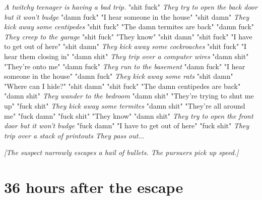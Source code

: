\documentclass{report}
\begin{document}
\textit{A twitchy teenager is having a bad trip.} "shit fuck" \textit{They try to open the back door but it won't budge} "damn fuck" "I hear someone in the house" "shit damn" \textit{They kick away some centipedes} "shit fuck" "The damn termites are back" "damn fuck" \textit{They creep to the garage} "shit fuck" "They know" "shit damn" \textit{} "shit fuck" "I have to get out of here" "shit damn" \textit{They kick away some cockroaches} "shit fuck" "I hear them closing in" "damn shit" \textit{They trip over a computer wires} "damn shit" "They're onto me" "damn fuck" \textit{They run to the basement} "damn fuck" "I hear someone in the house" "damn fuck" \textit{They kick away some rats} "shit damn" "Where can I hide?" "shit damn" \textit{} "shit fuck" "The damn centipedes are back" "damn shit" \textit{They wander to the bedroom} "damn shit" "They're trying to shut me up" "fuck shit" \textit{They kick away some termites} "damn shit" "They're all around me" "fuck damn" \textit{} "fuck shit" "They know" "damn shit" \textit{They try to open the front door but it won't budge} "fuck damn" "I have to get out of here" "fuck shit" \textit{They trip over a stack of printouts} \textit{They pass out}...

\textit{[The suspect narrowly escapes a hail of bullets. The pursuers pick up speed.]}


\section*{36 \small{hours after the escape}}
\end{document}
